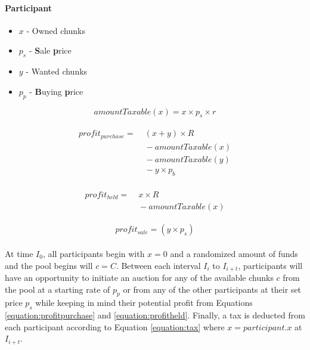 \paragraph{Participant}

\begin{itemize}
  \item $x$ - Owned chunks
  \item $p_s$ - \textbf{S}ale \textbf{p}rice
  \item $y$ - Wanted chunks
  \item $p_p$ - \textbf{B}uying \textbf{p}rice
\end{itemize}

\begin{equation} \label{equation:tax}
  amountTaxable(x) = x \times p_s \times r
\end{equation}

\begin{align} \label{equation:profitpurchase}
  \begin{split}
    profit_{purchase} = &\; (x + y) \times R \\
    &\; - amountTaxable(x) \\
    &\; - amountTaxable(y) \\
    &\; - y \times p_b
  \end{split}
\end{align}

\begin{align} \label{equation:profitheld}
  \begin{split}
    profit_{held} = &\; x \times R \\
    &\; - amountTaxable(x)
  \end{split}
\end{align}

\begin{equation} \label{equation:profitsale}
  profit_{sale} = (y \times p_s)
\end{equation}

\paragraph{} At time $I_0$, all participants begin with $x = 0$ and a randomized amount of funds and the pool begins will $c = C$. Between each interval $I_i$ to $I_{i + t}$, participants will have an opportunity to initiate an auction for any of the available chunks $c$ from the pool at a starting rate of $p_p$ or from any of the other participants at their set price $p_s$ while keeping in mind their potential profit from Equations \ref{equation:profitpurchase} and \ref{equation:profitheld}. Finally, a tax is deducted from each participant according to Equation \ref{equation:tax} where $x = participant.x$ at $I_{i + t}$.

